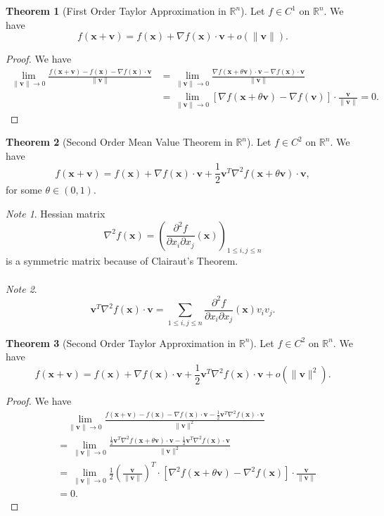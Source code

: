 \documentclass[12pt]{article}
\theoremstyle{definition}
\theoremstyle{definition}
\newtheorem{thm}{Theorem}[section]
\theoremstyle{definition}
\theoremstyle{definition}
\theoremstyle{definition}
\begin{document}
\begin{thm}[First Order Taylor Approximation in $\mathbb{R}^n$]
	Let $f \in C^1$ on $\mathbb{R}^n.$ We have $$f(\mathbf{x}+\mathbf{v})=f(\mathbf{x})+\nabla f(\mathbf{x})\cdot\mathbf{v}+o(\|\mathbf{v}\|).$$
\end{thm}
\begin{proof}
We have $$\begin{aligned}\lim_{\|\mathbf{v}\|\to0}\frac{f(\mathbf{x}+\mathbf{v})-f(\mathbf{x})-\nabla f(\mathbf{x})\cdot\mathbf{v}}{\|\mathbf{v}\|}&=\lim_{\|\mathbf{v}\|\to0}\frac{\nabla f(\mathbf{x}+\theta\mathbf{v})\cdot\mathbf{v}-\nabla f(\mathbf{x})\cdot\mathbf{v}}{\|\mathbf{v}\|}\\&=\lim_{\|\mathbf{v}\|\to0}[\nabla f(\mathbf{x}+\theta\mathbf{v})-\nabla f(\mathbf{v})]\cdot\frac{\mathbf{v}}{\|\mathbf{v}\|}=0.\end{aligned}$$
\end{proof}

\begin{thm}[Second Order Mean Value Theorem in $\mathbb{R}^n$]
	Let $f \in C^2$ on $\mathbb{R}^n.$ We have $$f(\mathbf{x}+\mathbf{v})=f(\mathbf{x})+\nabla f(\mathbf{x})\cdot\mathbf{v}+\frac{1}{2}\mathbf{v}^T\nabla^2f(\mathbf{x}+\theta\mathbf{v})\cdot\mathbf{v},$$ for some $\theta\in(0, 1).$
\end{thm}
\noindent \emph{Note 1}. Hessian matrix $$\nabla^2f(\mathbf{x})=\left(\frac{\partial^2f}{\partial x_i \partial x_j}(\mathbf{x})\right)_{1 \leq i, j \leq n}$$ is a symmetric matrix because of Clairaut's Theorem.
\\\\ \emph{Note 2}. $$\mathbf{v}^T\nabla^2f(\mathbf{x})\cdot\mathbf{v}=\sum_{1 \leq i, j \leq n}\frac{\partial^2f}{\partial x_i \partial x_j}(\mathbf{x})v_iv_j.$$

\begin{thm}[Second Order Taylor Approximation in $\mathbb{R}^n$]
	Let $f \in C^2$ on $\mathbb{R}^n.$ We have $$f(\mathbf{x}+\mathbf{v})=f(\mathbf{x})+\nabla f(\mathbf{x})\cdot\mathbf{v}+\frac{1}{2}\mathbf{v}^T\nabla^2f(\mathbf{x})\cdot\mathbf{v}+o(\|\mathbf{v}\|^2).$$
\end{thm}
\begin{proof}
We have $$\begin{aligned}&\ \ \ \ \lim_{\|\mathbf{v}\|\to0}\frac{f(\mathbf{x}+\mathbf{v})-f(\mathbf{x})-\nabla f(\mathbf{x})\cdot\mathbf{v}-\frac{1}{2}\mathbf{v}^T\nabla^2f(\mathbf{x})\cdot\mathbf{v}}{\|\mathbf{v}\|^2}\\&=\lim_{\|\mathbf{v}\|\to0}\frac{\frac{1}{2}\mathbf{v}^T\nabla^2f(\mathbf{x}+\theta\mathbf{v})\cdot\mathbf{v}-\frac{1}{2}\mathbf{v}^T\nabla^2f(\mathbf{x})\cdot\mathbf{v}}{\|\mathbf{v}\|^2}\\&=\lim_{\|\mathbf{v}\|\to0}\frac{1}{2}\left(\frac{\mathbf{v}}{\|\mathbf{v}\|}\right)^T\cdot[\nabla^2f(\mathbf{x}+\theta\mathbf{v})-\nabla^2f(\mathbf{x})]\cdot\frac{\mathbf{v}}{\|\mathbf{v}\|}\\&=0.\end{aligned}$$
\end{proof}
\end{document}
